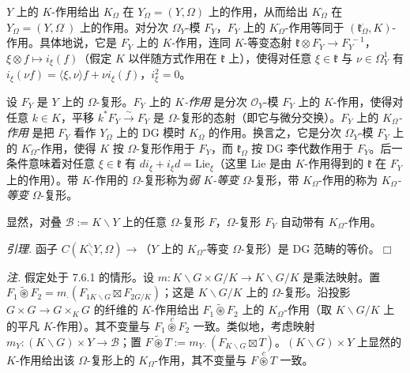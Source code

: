 $Y$ 上的 $K$-作用给出 $K_{\Omega}$ 在 $Y_{\Omega}=(Y,\Omega)$ 上的作用，从而给出 $K^{\cdot}_{\Omega}$ 在 $Y^{\cdot}_{\Omega}=(Y,\Omega^{\cdot})$ 上的作用。对分次 $\Omega^{\cdot}_{Y}$-模 $F^{\cdot}_{Y}$，$F^{\cdot}_{Y}$ 上的 $K^{\cdot}_{\Omega}$-作用等同于 $(\mathfrak{k}^{\cdot}_{\Omega},K)$-作用。具体地说，它是 $F^{\cdot}_{Y}$ 上的 $K$-作用，连同 $K$-等变态射 $\mathfrak{k}\otimes F^{\cdot}_{Y}\to F^{\cdot-1}_{Y}$，$\xi\otimes f\mapsto i_{\xi}(f)$（假定 $K$ 以伴随方式作用在 $\mathfrak{k}$ 上），使得对任意 $\xi\in\mathfrak{k}$ 与 $\nu\in\Omega^{1}_{Y}$ 有 $i_{\xi}(\nu f)=\langle\xi,\nu\rangle f+\nu i_{\xi}(f)$，$i^{2}_{\xi}=0$。

 设 $F_{Y}$ 是 $Y$ 上的 $\Omega$-复形。$F_{Y}$ 上的 \emph{$K$-作用} 是分次 $\mathcal{O}_{Y}$-模 $F^{\cdot}_{Y}$ 上的 $K$-作用，使得对任意 $k\in K$，平移 $k^{*}F^{\cdot}_{Y}\xrightarrow{\sim}F^{\cdot}_{Y}$ 是 $\Omega$-复形的态射（即它与微分交换）。$F_{Y}$ 上的 \emph{$K_{\Omega}$-作用} 是把 $F_{Y}$ 看作 $Y_{\Omega}$ 上的 DG 模时 $K_{\Omega}$ 的作用。换言之，它是分次 $\Omega^{\cdot}_{Y}$-模 $F^{\cdot}_{Y}$ 上的 $K^{\cdot}_{\Omega}$-作用，使得 $K$ 按 $\Omega$-复形作用于 $F_{Y}$，而 $\mathfrak{k}_{\Omega}$ 按 DG 李代数作用于 $F_{Y}$。后一条件意味着对任意 $\xi\in\mathfrak{k}$ 有 $di_{\xi}+i_{\xi}d=\mathrm{Lie}_{\xi}$（这里 $\mathrm{Lie}$ 是由 $K$-作用得到的 $\mathfrak{k}$ 在 $F^{\cdot}_{Y}$ 上的作用）。带 $K$-作用的 $\Omega$-复形称为\emph{弱 $K$-等变} $\Omega$-复形，带 $K_{\Omega}$-作用的称为 \emph{$K_{\Omega}$-等变} $\Omega$-复形。

显然，对叠 $\mathcal{B}:=K\backslash Y$ 上的任意 $\Omega$-复形 $F$，$\Omega$-复形 $F_{Y}$ 自动带有 $K_{\Omega}$-作用。

 \emph{引理.} 函子 $C(K^{\backslash}_{\backslash}Y,\Omega)\longrightarrow$（$Y$ 上的 $K_{\Omega}$-等变 $\Omega$-复形）是 DG 范畴的等价。\hfill$\Box$


 \emph{注.} 假定处于 7.6.1 的情形。设 $m:K\backslash G\times G/K\to K\backslash G/K$ 是乘法映射。置 $F_{1}\widetilde{\circledast}F_{2}=m_{\cdot}(F_{1K\backslash G}\boxtimes F_{2G/K})$；这是 $K\backslash G/K$ 上的 $\Omega$-复形。沿投影 $G\times G\to G\times_{K}G$ 的纤维的 $K$-作用给出 $F_{1}\widetilde{\circledast}F_{2}$ 上的 $K_{\Omega}$-作用（取 $K\backslash G/K$ 上的平凡 $K$-作用）。其不变量与 $F_{1}\overset{c}{\circledast}F_{2}$ 一致。类似地，考虑映射 $m_{Y}:(K\backslash G)\times Y\to\mathcal{B}$；置 $F\widetilde{\circledast}T:=m_{Y\cdot}(F_{K\backslash G}\boxtimes T)$。$(K\backslash G)\times Y$ 上显然的 $K$-作用给出该 $\Omega$-复形上的 $K_{\Omega}$-作用，其不变量与 $F\overset{c}{\circledast}T$ 一致。

